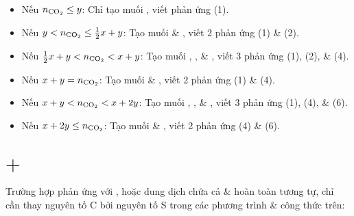 \documentclass{article}
\begin{document}
\begin{itemize}
	\item Nếu $n_{\ce{CO2}}\le y$: Chỉ tạo muối , viết phản ứng (1).
	\item Nếu $y < n_{\ce{CO2}}\le\frac{1}{2}x + y$: Tạo muối  \& , viết 2 phản ứng (1) \& (2).
	\item Nếu $\frac{1}{2}x + y < n_{\ce{CO2}} < x + y$: Tạo muối , , \& , viết 3 phản ứng (1), (2), \& (4).
	\item Nếu $x + y = n_{\ce{CO2}}$: Tạo muối  \& , viết 2 phản ứng (1) \& (4).
	\item Nếu $x + y < n_{\ce{CO2}} < x + 2y$: Tạo muối , , \& , viết 3 phản ứng (1), (4), \& (6).
	\item Nếu $x + 2y\le n_{\ce{CO2}}$: Tạo muối  \& , viết 2 phản ứng (4) \& (6).
\end{itemize}

\section{ $+$ }
Trường hợp  phản ứng với , hoặc dung dịch chứa cả  \&  hoàn toàn tương tự, chỉ cần thay nguyên tố C bởi nguyên tố S trong các phương trình \& công thức trên:
\vspace{2mm}
\end{document}
